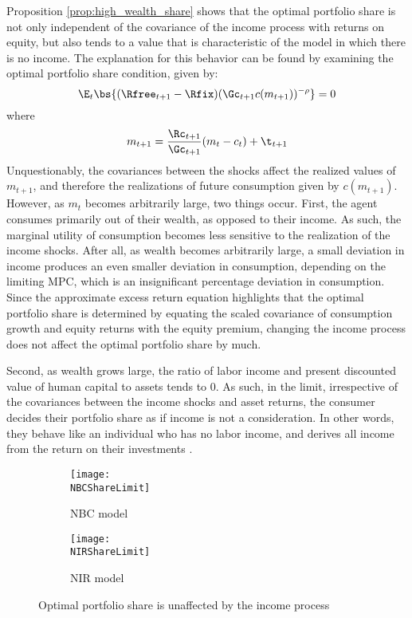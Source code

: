 Proposition \ref{prop:high_wealth_share} shows that the optimal portfolio share is not only independent of the covariance of the income process with returns on equity, but also tends to a value that is characteristic of the model in which there is no income. The explanation for this behavior can be found by examining the optimal portfolio share condition, given by:
\[
\E_{t}\bs{(\Rfree_{t+1} - \Rfix)(\Gc_{t+1}c(m_{t+1}))^{-\rho}} = 0
\]
where
\[
m_{t+1} = \frac{\Rc_{t+1}}{\Gc_{t+1}}(m_{t} - c_{t}) + \t_{t+1}
\]
Unquestionably, the covariances between the shocks affect the realized values of $m_{t+1}$, and therefore the realizations of future consumption given by $c(m_{t+1})$. However, as $m_{t}$ becomes arbitrarily large, two things occur. First, the agent consumes primarily out of their wealth, as opposed to their income. As such, the marginal utility of consumption becomes less sensitive to the realization of the income shocks. After all, as wealth becomes arbitrarily large, a small deviation in income produces an even smaller deviation in consumption, depending on the limiting MPC, which is an insignificant percentage deviation in consumption. Since the approximate excess return equation highlights that the optimal portfolio share is determined by equating the scaled covariance of consumption growth and equity returns with the equity premium, changing the income process does not affect the optimal portfolio share by much.

Second, as wealth grows large, the ratio of labor income and present discounted value of human capital to assets tends to 0. As such, in the limit, irrespective of the covariances between the income shocks and asset returns, the consumer decides their portfolio share as if income is not a consideration. In other words, they behave like an individual who has no labor income, and derives all income from the return on their investments \citep{Carroll2024}.

\begin{figure}[h]
    \centering
    \begin{subfigure}{0.49\textwidth}
        \centering
        \texttt{[image: \\NBCShareLimit]}
        \caption{NBC model}
        \label{subfig:shareLimit_NBC}
    \end{subfigure}
    \begin{subfigure}{0.49\textwidth}
        \centering
        \texttt{[image: \\NIRShareLimit]}
        \caption{NIR model}
        \label{subfig:shareLimit_NIR}
    \end{subfigure}
    \caption{Optimal portfolio share is unaffected by the income process}
    \label{fig:shareLimit}
\end{figure}

